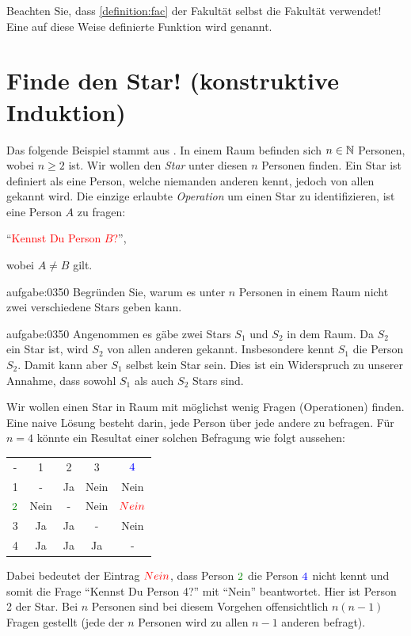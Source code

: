 \noindent
Beachten Sie, dass \cref{definition:fac} der Fakultät selbst die Fakultät verwendet! Eine auf diese Weise definierte Funktion wird  genannt.

\section{Finde den Star! (konstruktive Induktion)}
Das folgende Beispiel stammt aus \cite{Datenstrukturen}. In einem Raum befinden sich $n\in\mathbb{N}$ Personen, wobei $n\geq 2$ ist. Wir wollen den \textit{Star} unter diesen $n$ Personen finden. Ein Star ist definiert als eine Person, welche niemanden anderen kennt, jedoch von allen gekannt wird. Die einzige erlaubte \textit{Operation} um einen Star zu identifizieren, ist eine Person $A$ zu fragen:
\begin{center}
    \enquote{\textcolor{Red}{Kennst Du Person $B$?}},
\end{center}
wobei $A\neq B$ gilt.

\begin{aufgabe}{aufgabe:0350}
    Begründen Sie, warum es unter $n$ Personen in einem Raum nicht zwei verschiedene Stars geben kann.
\end{aufgabe}
\begin{antwort}{aufgabe:0350}
Angenommen es gäbe zwei Stars $S_1$ und $S_2$ in dem Raum. Da $S_2$ ein Star ist, wird $S_2$ von allen anderen gekannt. Insbesondere kennt $S_1$ die Person $S_2$. Damit kann aber $S_1$ selbst kein Star sein. Dies ist ein Widerspruch zu unserer Annahme, dass sowohl $S_1$ als auch $S_2$ Stars sind.
\end{antwort}
\noindent
Wir wollen einen Star in Raum mit möglichst wenig Fragen (Operationen) finden. Eine naive Lösung besteht darin, jede Person über jede andere zu befragen. Für $n=4$ könnte ein Resultat einer solchen Befragung wie folgt aussehen:
\begin{table}[H]
\centering
    \begin{tabular}{ccccc}
    -                                        & 1    & 2  & 3    & $\textcolor{Blue}{4}$   \\
    1                                       & -    & Ja & Nein & Nein                                     \\
    $\textcolor{Green}{2}$ & Nein & -  & Nein & $\textcolor{Red}{Nein}$ \\
    3                                       & Ja   & Ja & -    & Nein                                     \\
    4                                       & Ja   & Ja & Ja   & -                                       
    \end{tabular}
\end{table}
\noindent
Dabei bedeutet der Eintrag $\textcolor{Red}{Nein}$, dass Person $\textcolor{Green}{2}$ die Person $\textcolor{Blue}{4}$ nicht kennt und somit die Frage \enquote{Kennst Du Person 4?} mit \enquote{Nein} beantwortet. Hier ist Person 2 der Star. Bei $n$ Personen sind bei diesem Vorgehen offensichtlich $n(n-1)$ Fragen gestellt (jede der $n$ Personen wird zu allen $n-1$ anderen befragt).

